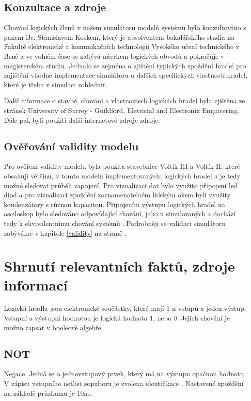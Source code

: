 \documentclass[11pt,a4paper]{article}
\begin{document}
		\subsection{Konzultace a zdroje}
			Chování logických členů v našem simulátoru modelů systému  bylo konzultováno s panem Bc. Stanislavem Koskem, který je absolventem bakalářského studia na Fakultě elektronické a komunikačních technologií Vysokého učení technického v Brně a ve volném čase se zabývá návrhem logických obvodů a pokračuje v magisterském studiu. Jednalo se zejména o zjištění typických zpoždění hradel pro zajištění vhodné implementace simulátoru a dalších specifických vlastností hradel, které je třeba v simulaci zohlednit.

			Další informace o stavbě, chování a vlastnostech logickách hradel byla zjištěna ze stránek University of Surrey - Guildford, Eletricial and Electronix Engineering\cite{logicGate}. Dále pak byli použiti další internetové zdroje zdroje\cite{logicGateWiki}.

		\subsection{Ověřování validity modelu}
			Pro ověření validity modelu  byla použita stavebnice Voltík III a Voltík II, které obsahují většinu, v tomto modelu implementovaných, logických hradel a je tedy možné sledovat průběh zapojení. Pro vizualizaci dat bylo využito připojení led diod a pro vizualizaci zpoždění zaznamenatelném lidským okem byli využity kondenzátory s různou kapacitou. Připojením výstupu logických hradel na osciloskop bylo sledováno odpovídající chování, jako u simulovaných a dochází tedy k ekvivalentnímu chování systémů . Podrobněji se validaci simulátoru zabýváme v kapitole \ref{validity} na straně \pageref{validity}.


	\section{Shrnutí relevantních faktů, zdroje informací}

		Logická hradla jsou elektronické součástky, které mají 1-n vstupů a jeden výstup. Vstupní a výstupní hodnotou je logická hodnota 1, nebo 0. Jejich chování je možno zapsat v booleově algebře. \cite{logicGate}

			\subsection{NOT}
				Negace. Jedná se o jednovstupový prvek, který má na výstupu opačnou hodnotu. V zápisu vstupního netlist sopuboru je zvolena identifikace . Nastavené zpoždění na základě průzkumu je 10ns\cite{notSheet}.
\end{document}

